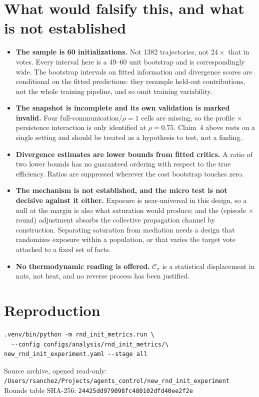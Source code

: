 \documentclass[11pt]{article}
\begin{document}
\section{What would falsify this, and what is not established}\label{sec:limits}
\begin{itemize}
\item \textbf{The sample is 60 initializations.} Not 1382 trajectories, not
$24\times$ that in votes. Every interval here is a 49--60 unit bootstrap and
is correspondingly wide. The bootstrap intervals on fitted information and divergence scores
are conditional on the fitted predictions: they resample held-out contributions, not the
whole training pipeline, and so omit training variability.
\item \textbf{The snapshot is incomplete and its own validation is marked invalid.} Four
full-communication/$\rho{=}1$ cells are missing, so the profile $\times$ persistence
interaction is only identified at $\rho=0.75$. Claim~4 above rests on a single setting and
should be treated as a hypothesis to test, not a finding.
\item \textbf{Divergence estimates are lower bounds from fitted critics.} A ratio of two
lower bounds has no guaranteed ordering with respect to the true efficiency. Ratios are
suppressed wherever the cost bootstrap touches zero.
\item \textbf{The mechanism is not established, and the micro test is not decisive against
it either.} Exposure is near-universal in this design, so a null at the margin is also what
saturation would produce; and the (episode $\times$ round) adjustment absorbs the collective
propagation channel by construction. Separating saturation from mediation needs a design that
randomizes exposure within a population, or that varies the target vote attached to a fixed
set of facts.
\item \textbf{No thermodynamic reading is offered.} $\mathcal C_\pi$ is a statistical
displacement in nats, not heat, and no reverse process has been justified.
\end{itemize}

\section*{Reproduction}
\begin{small}
\begin{verbatim}
.venv/bin/python -m rnd_init_metrics.run \
  --config configs/analysis/rnd_init_metrics/\
new_rnd_init_experiment.yaml --stage all
\end{verbatim}
\end{small}
\noindent Source archive, opened read-only:\\
\texttt{\small /Users/rsanchez/Projects/agents\_control/new\_rnd\_init\_experiment}\\
Rounds table SHA-256: \texttt{\small 24425dd979098fc480102dfd40ee2f2e}
\end{document}
